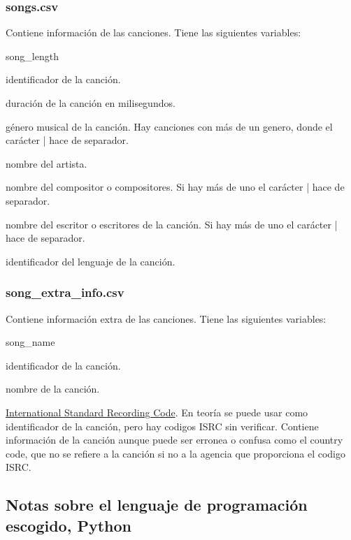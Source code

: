 \documentclass[a4paper]{article}
\begin{document}
\subsubsection*{songs.csv}

Contiene información de las canciones. Tiene las siguientes variables:

\begin{labeling}{song\_length}
\item [song\_id] identificador de la canción.
\item [song\_length] duración de la canción en milisegundos.
\item [genre\_ids] género musical de la canción. Hay canciones con más de un genero, donde el carácter | hace de separador.
\item [artist\_name] nombre del artista.
\item [composer] nombre del compositor o compositores. Si hay más de uno el carácter | hace de separador.
\item [lyricist] nombre del escritor o escritores de la canción. Si hay más de uno el carácter | hace de separador.
\item [language] identificador del lenguaje de la canción.
\end{labeling}

\subsubsection*{song\_extra\_info.csv}

Contiene información extra de las canciones. Tiene las siguientes variables:

\begin{labeling}{song\_name}
\item [song\_id] identificador de la canción.
\item [song\_name] nombre de la canción.
\item [isrc] \href{https://en.wikipedia.org/wiki/International_Standard_Recording_Code}{International Standard Recording Code}. En teoría se puede usar como identificador de la canción, pero hay codigos ISRC sin verificar. Contiene información de la canción aunque puede ser erronea o confusa como el country code, que no se refiere a la canción si no a la agencia que proporciona el codigo ISRC.
\end{labeling}

\subsection{Notas sobre el lenguaje de programación escogido, Python}
\end{document}
